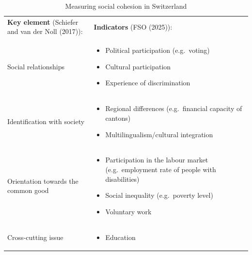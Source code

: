 \documentclass[
  a4paper,
  openany]{book}
\providecommand{\tightlist}{%
  \setlength{\itemsep}{0pt}\setlength{\parskip}{0pt}}
\begin{document}
\begin{longtable}[]{@{}
  >{\raggedright\arraybackslash}p{}
  >{\raggedright\arraybackslash}p{}@{}}
\caption{Measuring social cohesion in
Switzerland}\label{tbl-socialCohesion}\tabularnewline
\toprule\noalign{}
\endfirsthead
\endhead
\bottomrule\noalign{}
\endlastfoot
\textbf{Key element} (Schiefer and van der Noll (2017)): &
\textbf{Indicators} (FSO (2025)): \textbar{} \\
Social relationships & \begin{minipage}[t]{\linewidth}\raggedright
\begin{itemize}
\item
  Political participation (e.g.~voting)
\item
  Cultural participation
\item
  Experience of discrimination
\end{itemize}
\end{minipage} \\
Identification with society &
\begin{minipage}[t]{\linewidth}\raggedright
\begin{itemize}
\item
  Regional differences (e.g.~financial capacity of cantons)
\item
  Multilingualism/cultural integration
\end{itemize}
\end{minipage} \\
Orientation towards the common good &
\begin{minipage}[t]{\linewidth}\raggedright
\begin{itemize}
\item
  Participation in the labour market (e.g.~employment rate of people
  with disabilities)
\item
  Social inequality (e.g.~poverty level)
\item
  Voluntary work
\end{itemize}
\end{minipage} \\
Cross-cutting issue & \begin{minipage}[t]{\linewidth}\raggedright
\begin{itemize}
\tightlist
\item
  Education
\end{itemize}
\end{minipage} \\
\end{longtable}
\end{document}
